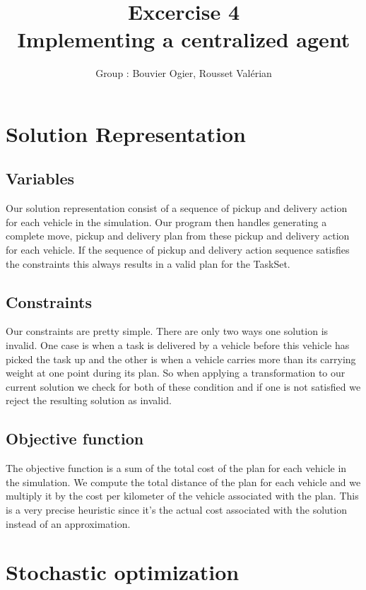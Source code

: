 \documentclass[11pt]{article}
\title{\bf Excercise 4\\ Implementing a centralized agent}
\author{Group \textnumero 17 : Bouvier Ogier, Rousset Valérian}
\begin{document}
\maketitle

\section{Solution Representation}

\subsection{Variables}

Our solution representation consist of a sequence of pickup and delivery
action for each vehicle in the simulation. Our program then handles
generating a complete move, pickup and delivery plan from these pickup
and delivery action for each vehicle. If the sequence of pickup and
delivery action sequence satisfies the constraints this always results
in a valid plan for the TaskSet.

\subsection{Constraints}
Our constraints are pretty simple. There are only two ways one
solution is invalid. One case is when a task is delivered by a vehicle
before this vehicle has picked the task up and the other is when a
vehicle carries more than its carrying weight at one point during its
plan.
So when applying a transformation to our current solution we check for
both of these condition and if one is not satisfied we reject the
resulting solution as invalid.


\subsection{Objective function}
The objective function is a sum of the total cost of the plan for each
vehicle in the simulation. We compute the total distance of the plan
for each vehicle and we multiply it by the cost per kilometer of the
vehicle associated with the plan. This is a very precise heuristic
since it's the actual cost associated with the solution instead of an
approximation.

\section{Stochastic optimization}
\end{document}
